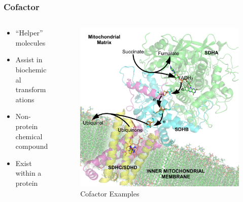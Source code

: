 \documentclass[10pt]{beamer}
\begin{document}
\begin{frame}
	\frametitle{Cofactor}

	\begin{columns}[T]
		\begin{column}{.5\textwidth}
			\begin{itemize}
				\item ``Helper'' molecules
				\item Assist in biochemical transformations
				\item Non-protein chemical compound
				\item Exist within a protein
			\end{itemize}
		\end{column}
		\begin{column}{.5\textwidth}
			\begin{figure}
				\includegraphics[width=1.0\textwidth,natwidth=1630,natheight=1620]{img/Succinate_Dehydrogenase_1YQ3_Electron_Carriers_Labeled.png}
				\caption{Cofactor Examples}
			\end{figure}
		\end{column}
	\end{columns}
	
\end{frame}
\end{document}
